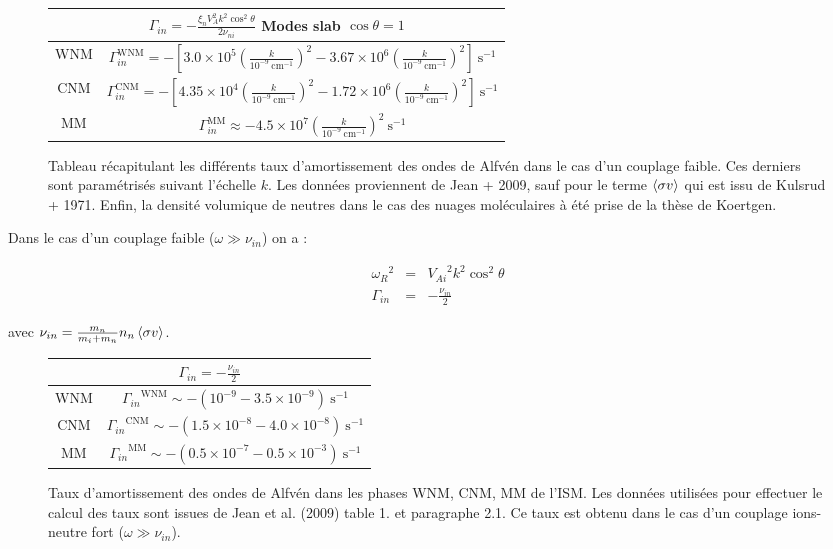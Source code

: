 \documentclass[10pt,a4paper]{article}
\begin{document}
\begin{figure}[h]
\center
\begin{tabular}{|c|c|}
\hline 
\multicolumn{2}{|c|}{$\Gamma_{in} = - \frac{\xi_n V^2_A k^2 \cos^2{\theta} }{2 \nu_{ni}}$ Modes slab $\cos{\theta} = 1$ } \\ 
\hline 
WNM & $\Gamma^{\mathrm{WNM}}_{in} = - \left[ 3.0 \times 10^5 \left( \frac{k}{10^{-9}~\mathrm{cm}^{-1}} \right)^2 - 3.67 \times 10^6 \left( \frac{k}{10^{-9}~\mathrm{cm}^{-1}} \right)^2 \right]~ \mathrm{s}^{-1}$ \\ 

CNM & $\Gamma^{\mathrm{CNM}}_{in} = - \left[ 4.35 \times 10^4 \left( \frac{k}{10^{-9}~\mathrm{cm}^{-1}} \right)^2 - 1.72 \times 10^6 \left( \frac{k}{10^{-9}~\mathrm{cm}^{-1}} \right)^2 \right]~ \mathrm{s}^{-1}$ \\ 

MM & $\Gamma^{\mathrm{MM}}_{in} \approx  - 4.5 \times 10^7 \left( \frac{k}{10^{-9}~\mathrm{cm}^{-1}} \right)^2~ \mathrm{s}^{-1} $ \\ 
\hline 
\end{tabular} 

\caption{Tableau récapitulant les différents taux d'amortissement des ondes de Alfvén dans le cas d'un couplage faible. Ces derniers sont paramétrisés suivant l'échelle $k$. Les données proviennent de Jean + 2009, sauf pour le terme $\expval{\sigma v}$ qui est issu de Kulsrud + 1971. Enfin, la densité volumique de neutres dans le cas des nuages moléculaires à été prise de la thèse de Koertgen.}
\end{figure}

Dans le cas d'un couplage faible ($\omega \gg \nu_{in}$) on a : 

\begin{eqnarray}
	{\omega_R}^2 & = & {V_{Ai}}^2 k^2 \cos^2{\theta} \\ 
	\Gamma_{in}  & = & - \frac{\nu_{in}}{2} \label{taux_fort}
\end{eqnarray}

avec $\nu_{in} = \frac{m_n}{m_i + m_n}n_n \expval{\sigma v}$.  \\ 

\begin{figure}
\center
\begin{tabular}{|c|c|}
\hline 
\multicolumn{2}{|c|}{$\Gamma_{in} = - \frac{\nu_{in}}{2}$} \\ 
\hline 
WNM & ${\Gamma_{in}}^{\mathrm{WNM}} \sim - \left( 10^{-9} - 3.5 \times 10^{-9} \right)~\mathrm{s}^{-1}$ \\  
CNM & ${\Gamma_{in}}^{\mathrm{CNM}} \sim - \left( 1.5\times 10^{-8} - 4.0 \times 10^{-8} \right)~\mathrm{s}^{-1}$ \\ 
MM & ${\Gamma_{in}}^{\mathrm{MM}} \sim - \left( 0.5 \times 10^{-7} - 0.5 \times 10^{-3} \right)~\mathrm{s}^{-1}$ \\ 
\hline 
\end{tabular}
\caption{Taux d'amortissement des ondes de Alfvén dans les phases WNM, CNM, MM de l'ISM. Les données utilisées pour effectuer le calcul des taux sont issues de Jean et al. (2009) table 1. et paragraphe 2.1. Ce taux est obtenu dans le cas d'un couplage ions-neutre fort ($\omega \gg \nu_{in}$). } 
\end{figure}
\end{document}
